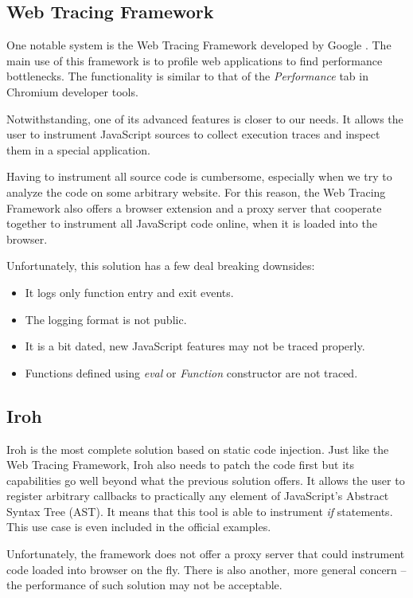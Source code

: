 \subsection{Web Tracing Framework}
One notable system is the Web Tracing Framework developed by Google \cite{google:wtf}.
The main use of this framework is to profile web applications to find performance bottlenecks.
The functionality is similar to that of the \emph{Performance} tab in Chromium developer tools.

Notwithstanding, one of its advanced features is closer to our needs. 
It allows the user to instrument JavaScript sources 
to collect execution traces and inspect them in a special application.

Having to instrument all source code is cumbersome, especially when we try to analyze the code on some
arbitrary website. For this reason, the Web Tracing Framework also offers a browser extension and a proxy server 
that cooperate together to instrument all JavaScript code online, when it is loaded into the browser.

Unfortunately, this solution has a few deal breaking downsides:
\begin{itemize}
  \item It logs only function entry and exit events.
  \item The logging format is not public.
  \item It is a bit dated, new JavaScript features may not be traced properly.
  \item Functions defined using \emph{eval} or \emph{Function} constructor are not traced.
\end{itemize}

\subsection{Iroh}
Iroh \cite{iroh} is the most complete solution based on static code injection.
Just like the Web Tracing Framework, Iroh also needs to patch the code first but its capabilities go well
beyond what the previous solution offers. It allows the user to register arbitrary callbacks to practically any
element of JavaScript's Abstract Syntax Tree (AST). It means that this tool is able to instrument \emph{if} statements.
This use case is even included in the official examples.

Unfortunately, the framework does not offer a proxy server that could instrument code loaded into browser on the fly.
There is also another, more general concern -- the performance of such solution may not be acceptable.

